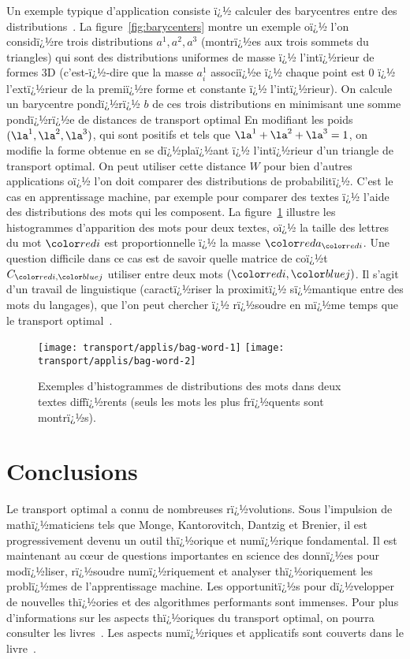 Un exemple typique d'application consiste ï¿½ calculer des barycentres entre des distributions~\cite{agueh2011barycenters}. La figure~\ref{fig:barycenters} montre un exemple oï¿½ l'on considï¿½re trois distributions $a^1,a^2,a^3$ (montrï¿½es aux trois sommets du triangles) qui sont des distributions uniformes de masse ï¿½ l'intï¿½rieur de formes 3D (c'est-ï¿½-dire que la masse $a^1_i$ associï¿½e ï¿½ chaque point est 0 ï¿½ l'extï¿½rieur de la premiï¿½re forme et constante ï¿½ l'intï¿½rieur). On calcule un barycentre pondï¿½rï¿½ $b$ de ces trois distributions en minimisant une somme pondï¿½rï¿½e de distances de transport optimal
En modifiant les poids $(\la^1,\la^2,\la^3)$, qui sont positifs et tels que $\la^1+\la^2+\la^3=1$, on modifie la forme obtenue en se dï¿½plaï¿½ant ï¿½ l'intï¿½rieur d'un triangle de transport optimal. 
%
On peut utiliser cette distance $W$ pour bien d'autres applications oï¿½ l'on doit comparer des distributions de probabilitï¿½. C'est le cas en apprentissage machine, par exemple pour comparer des textes ï¿½ l'aide des distributions des mots qui les composent. La figure~\ref{fig:bagwords} illustre les histogrammes d'apparition des mots pour deux textes, oï¿½ la taille des lettres du mot $\iC$ est proportionnelle ï¿½ la masse $\aC_\iC$. Une question difficile dans ce cas est de savoir quelle matrice de coï¿½t $C_{\iC,\jC}$ utiliser entre deux mots $(\iC,\jC)$. Il s'agit d'un travail de linguistique (caractï¿½riser la proximitï¿½ sï¿½mantique entre des mots du langages), que l'on peut chercher ï¿½ rï¿½soudre en mï¿½me temps que le transport optimal~\cite{huang2016supervised}. 

\begin{figure}\centering
    \texttt{[image: transport/applis/bag-word-1]}
    \qquad
    \texttt{[image: transport/applis/bag-word-2]}
\caption{\label{fig:bagwords} Exemples d'histogrammes de distributions des mots dans deux textes diffï¿½rents (seuls les mots les plus frï¿½quents sont montrï¿½s).  }
\end{figure}


\section*{Conclusions}

Le transport optimal a connu de nombreuses rï¿½volutions. Sous l'impulsion de mathï¿½maticiens tels que Monge, Kantorovitch, Dantzig et Brenier, il est progressivement devenu un outil thï¿½orique et numï¿½rique fondamental. 
%
Il est maintenant au c\oe{}ur de questions importantes en science des donnï¿½es pour modï¿½liser, rï¿½soudre numï¿½riquement et analyser thï¿½oriquement les problï¿½mes de l'apprentissage machine. Les opportunitï¿½s pour dï¿½velopper de nouvelles thï¿½ories et des algorithmes performants sont immenses. 
%
Pour plus d'informations sur les aspects thï¿½oriques du transport optimal, on pourra consulter les livres~\cite{Villani03,SantambrogioBook}. Les aspects numï¿½riques et applicatifs sont couverts dans le livre~\cite{PeyreCuturi}.


